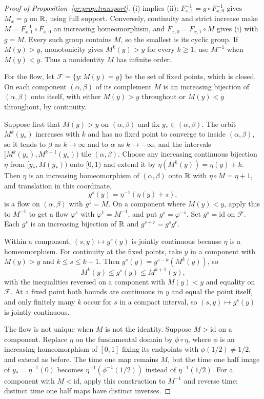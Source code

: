\begin{proof}[Proof of Proposition~\ref{gr:prop:transport}]
(i) implies (ii): $F_{x,1}^{-1}=g\circ F_{x,0}^{-1}$ gives $M_x=g$ on $\mathbb{R}$, using full support. Conversely, continuity and strict increase make $M=F_{x,1}^{-1}\circ F_{x,0}$ an increasing homeomorphism, and $F_{x,0}=F_{x,1}\circ M$ gives (i) with $g=M$. Every such group contains $M$, so the smallest is its cyclic group. If $M(y)>y$, monotonicity gives $M^k(y)>y$ for every $k\ge1$; use $M^{-1}$ when $M(y)<y$. Thus a nonidentity $M$ has infinite order.

For the flow, let $\mathcal F=\{y:M(y)=y\}$ be the set of fixed points, which is closed. On each component $(\alpha,\beta)$ of its complement $M$ is an increasing bijection of $(\alpha,\beta)$ onto itself, with either $M(y)>y$ throughout or $M(y)<y$ throughout, by continuity.

Suppose first that $M(y)>y$ on $(\alpha,\beta)$ and fix $y_*\in(\alpha,\beta)$. The orbit $M^k(y_*)$ increases with $k$ and has no fixed point to converge to inside $(\alpha,\beta)$, so it tends to $\beta$ as $k\to\infty$ and to $\alpha$ as $k\to-\infty$, and the intervals $[M^k(y_*),M^{k+1}(y_*))$ tile $(\alpha,\beta)$. Choose any increasing continuous bijection $\eta$ from $[y_*,M(y_*))$ onto $[0,1)$ and extend it by $\eta(M^k(y))=\eta(y)+k$. Then $\eta$ is an increasing homeomorphism of $(\alpha,\beta)$ onto $\mathbb{R}$ with $\eta\circ M=\eta+1$, and translation in this coordinate,
\[
g^{s}(y)=\eta^{-1}(\eta(y)+s),
\]
is a flow on $(\alpha,\beta)$ with $g^{1}=M$. On a component where $M(y)<y$, apply this to $M^{-1}$ to get a flow $\varphi^{s}$ with $\varphi^{1}=M^{-1}$, and put $g^{s}=\varphi^{-s}$. Set $g^{s}=\mathrm{id}$ on $\mathcal F$. Each $g^{s}$ is an increasing bijection of $\mathbb{R}$ and $g^{s+r}=g^{s}g^{r}$.

Within a component, $(s,y)\mapsto g^{s}(y)$ is jointly continuous because $\eta$ is a homeomorphism. For continuity at the fixed points, take $y$ in a component with $M(y)>y$ and $k\le s\le k+1$. Then $g^{s}(y)=g^{s-k}(M^k(y))$, so
\[
M^k(y)\le g^{s}(y)\le M^{k+1}(y),
\]
with the inequalities reversed on a component with $M(y)<y$ and equality on $\mathcal F$. At a fixed point both bounds are continuous in $y$ and equal the point itself, and only finitely many $k$ occur for $s$ in a compact interval, so $(s,y)\mapsto g^{s}(y)$ is jointly continuous.

The flow is not unique when $M$ is not the identity. Suppose $M>\mathrm{id}$ on a component. Replace $\eta$ on the fundamental domain by $\phi\circ\eta$, where $\phi$ is an increasing homeomorphism of $[0,1]$ fixing its endpoints with $\phi(1/2)\ne1/2$, and extend as before. The time one map remains $M$, but the time one half image of $y_*=\eta^{-1}(0)$ becomes $\eta^{-1}(\phi^{-1}(1/2))$ instead of $\eta^{-1}(1/2)$. For a component with $M<\mathrm{id}$, apply this construction to $M^{-1}$ and reverse time; distinct time one half maps have distinct inverses.
\end{proof}


